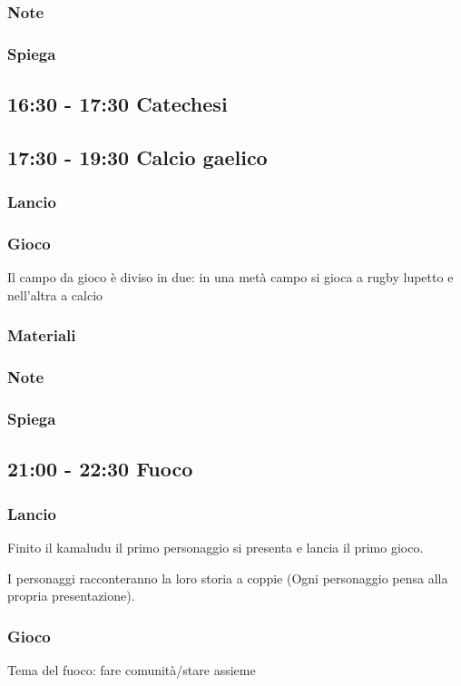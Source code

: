 \documentclass[../main.tex]{subfiles}
\begin{document}
       \subsubsection{Note}
       \subsubsection{Spiega}

    \subsection{16:30 - 17:30 Catechesi}   
    \subsection{17:30 - 19:30 Calcio gaelico}
        \subsubsection{Lancio}
        \subsubsection{Gioco}
        Il campo da gioco è diviso in due: in una metà campo si gioca a rugby lupetto e nell'altra a calcio
        \subsubsection{Materiali}
        \subsubsection{Note}
        \subsubsection{Spiega}
        
    \subsection{21:00 - 22:30 Fuoco}
        \subsubsection{Lancio}
        Finito il kamaludu il primo personaggio si presenta e lancia il primo gioco.

        I personaggi racconteranno la loro storia a coppie (Ogni personaggio pensa alla propria presentazione).
        \subsubsection{Gioco}
        Tema del fuoco: fare comunità/stare assieme
        
\end{document}
